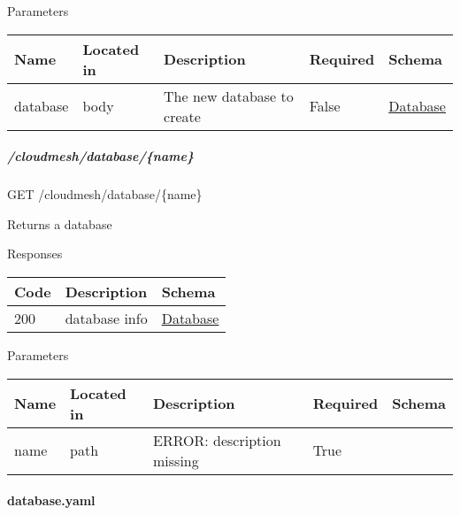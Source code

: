 \documentclass[9pt,]{article}
\let\oldparagraph\paragraph
\renewcommand{\paragraph}[1]{\oldparagraph{#1}\mbox{}}
\let\oldsubparagraph\subparagraph
\renewcommand{\subparagraph}[1]{\oldsubparagraph{#1}\mbox{}}
\begin{document}
Parameters

\begin{longtable}[]{@{}lllll@{}}
\toprule
Name & Located in & Description & Required & Schema\tabularnewline
\midrule
\endhead
database & body & The new database to create & False &
\protect\hyperlink{database}{Database}\tabularnewline
\bottomrule
\end{longtable}

\hypertarget{cloudmeshdatabasename}{%
\subparagraph{/cloudmesh/database/\{name\}}\label{cloudmeshdatabasename}}

GET /cloudmesh/database/\{name\}

Returns a database

Responses

\begin{longtable}[]{@{}lll@{}}
\toprule
Code & Description & Schema\tabularnewline
\midrule
\endhead
200 & database info &
\protect\hyperlink{database}{Database}\tabularnewline
\bottomrule
\end{longtable}

Parameters

\begin{longtable}[]{@{}lllll@{}}
\toprule
Name & Located in & Description & Required & Schema\tabularnewline
\midrule
\endhead
name & path & ERROR: description missing & True &\tabularnewline
\bottomrule
\end{longtable}

\hypertarget{database.yaml}{%
\paragraph{database.yaml}\label{database.yaml}}
\end{document}
